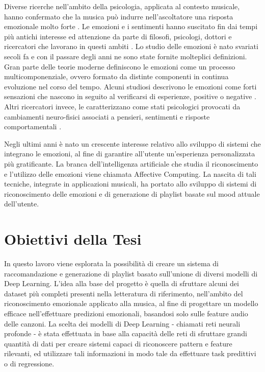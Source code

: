 \documentclass[11pt]{report}
\begin{document}
Diverse ricerche nell'ambito della psicologia, applicata al contesto musicale, hanno confermato che la musica può indurre nell'ascoltatore una risposta emozionale molto forte \cite{Krumhansl}\cite{Mitterschiffthaler2007Nov}\cite{Charlotte}. Le emozioni e i sentimenti hanno suscitato fin dai tempi più antichi interesse ed attenzione da parte di filosofi, psicologi, dottori e ricercatori che lavorano in questi ambiti \cite{Barrett2006Mar}. Lo studio delle emozioni è nato svariati secoli fa e con il passare degli anni ne sono state fornite molteplici definizioni. Gran parte delle teorie moderne definiscono le emozioni come un processo multicomponenziale, ovvero formato da distinte componenti in continua evoluzione nel corso del tempo. Alcuni studiosi descrivono le emozioni come forti sensazioni che nascono in seguito al verificarsi di esperienze, positive o negative \cite{knuuttila2004emotions}. Altri ricercatori invece, le caratterizzano come stati psicologici provocati da cambiamenti neuro-fisici associati a pensieri, sentimenti e risposte comportamentali \cite{Chaturvedi2022Feb}.


Negli ultimi anni è nato un crescente interesse relativo allo sviluppo di sistemi che integrano le emozioni, al fine di garantire all'utente un'esperienza personalizzata più gratificante. La branca dell'intelligenza artificiale che studia il riconoscimento e l'utilizzo delle emozioni viene chiamata Affective Computing\cite{picard2000affective}. La nascita di tali tecniche, integrate in applicazioni musicali, ha portato allo sviluppo di sistemi di riconoscimento delle emozioni e di generazione di playlist basate sul mood attuale dell'utente.

\section{Obiettivi della Tesi}



In questo lavoro viene esplorata la possibilità di creare un sistema di raccomandazione e generazione di playlist basato sull'unione di diversi modelli di Deep Learning. L'idea alla base del progetto è quella di sfruttare alcuni dei dataset più completi presenti nella letteratura di riferimento, nell'ambito del riconoscimento emozionale applicato alla musica, al fine di progettare un modello efficace nell'effettuare predizioni emozionali, basandosi solo sulle feature audio delle canzoni. La scelta dei modelli di Deep Learning - chiamati reti neurali profonde - è stata effettuata in base alla capacità delle reti di sfruttare grandi quantità di dati per creare sistemi capaci di riconoscere pattern e feature rilevanti, ed utilizzare tali informazioni in modo tale da effettuare task predittivi o di regressione.
\end{document}

